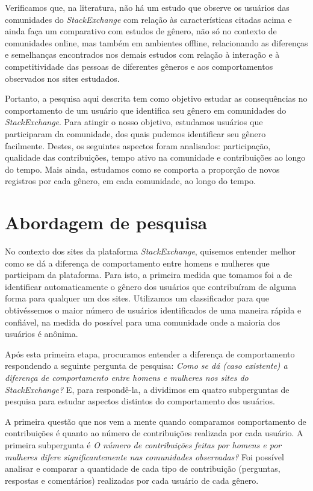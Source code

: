 Verificamos que, na literatura, não há um estudo que observe os usuários das comunidades do \emph{StackExchange} com relação às características citadas acima e ainda faça um comparativo com estudos de gênero, não só no contexto de comunidades online, mas também em ambientes offline, relacionando as diferenças e semelhanças encontrados nos demais estudos com relação à interação e à competitividade das pessoas de diferentes gêneros e aos comportamentos observados nos sites estudados.

Portanto, a pesquisa aqui descrita tem como objetivo estudar as consequências no comportamento de um usuário que identifica seu gênero em comunidades do \emph{StackExchange}. Para atingir o nosso objetivo, estudamos usuários que participaram da comunidade, dos quais pudemos identificar seu gênero facilmente. Destes, os seguintes aspectos foram analisados: participação, qualidade das contribuições, tempo ativo na comunidade e contribuições ao longo do tempo. Mais ainda, estudamos como se comporta a proporção de novos registros por cada gênero, em cada comunidade, ao longo do tempo.


\section{Abordagem de pesquisa}
No contexto dos sites da plataforma \emph{StackExchange}, quisemos entender melhor como se dá a diferença de comportamento entre homens e mulheres que participam da plataforma. Para isto, a primeira medida que tomamos foi a de identificar automaticamente o gênero dos usuários que contribuíram de alguma forma para qualquer um dos sites. Utilizamos um classificador para que obtivéssemos o maior número de usuários identificados de uma maneira rápida e confiável, na medida do possível para uma comunidade onde a maioria dos usuários é anônima.

Após esta primeira etapa, procuramos entender a diferença de comportamento respondendo a seguinte pergunta de pesquisa: \emph{Como se dá (caso existente) a diferença de comportamento entre homens e mulheres nos sites do StackExchange?} E, para respondê-la, a dividimos em quatro subperguntas de pesquisa para estudar aspectos distintos do comportamento dos usuários.

A primeira questão que nos vem a mente quando comparamos comportamento de contribuições é quanto ao número de contribuições realizada por cada usuário. A primeira subpergunta é \textit{O número de contribuições feitas por homens e por mulheres difere significantemente nas comunidades observadas?} Foi possível analisar e comparar a quantidade de cada tipo de contribuição (perguntas, respostas e comentários) realizadas por cada usuário de cada gênero.

